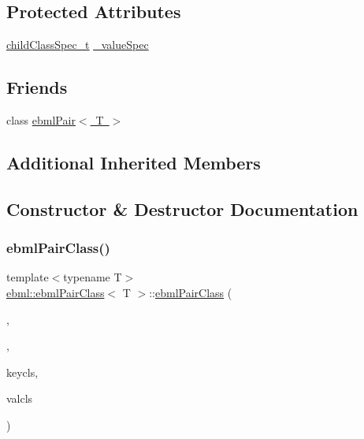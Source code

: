 \subsection*{Protected Attributes}
\begin{DoxyCompactItemize}
\item 
\mbox{\hyperlink{classebml_1_1childClassSpec__t}{child\+Class\+Spec\+\_\+t}} \mbox{\hyperlink{classebml_1_1ebmlPairClass_ad560a3a9e6b47eb8e51e707de59df919}{\+\_\+value\+Spec}}
\end{DoxyCompactItemize}
\subsection*{Friends}
\begin{DoxyCompactItemize}
\item 
class \mbox{\hyperlink{classebml_1_1ebmlPairClass_ad1db4b5395f31070d1be2d251ee85e02}{ebml\+Pair$<$ T $>$}}
\end{DoxyCompactItemize}
\subsection*{Additional Inherited Members}


\subsection{Constructor \& Destructor Documentation}
\mbox{\label{classebml_1_1ebmlPairClass_aeb7ee60aa846a317cecc39c5c79aeb2e}} 
\subsubsection{\texorpdfstring{ebml\+Pair\+Class()}{ebmlPairClass()}\hspace{0.1cm}{\footnotesize\ttfamily [1/4]}}
{\footnotesize\ttfamily template$<$typename T$>$ \\
\mbox{\hyperlink{classebml_1_1ebmlPairClass}{ebml\+::ebml\+Pair\+Class}}$<$ T $>$\+::\mbox{\hyperlink{classebml_1_1ebmlPairClass}{ebml\+Pair\+Class}} (\begin{DoxyParamCaption}\item[{const char $\ast$}]{,  }\item[{const std\+::wstring \&}]{,  }\item[{const \mbox{\hyperlink{classebml_1_1ebmlElementClass}{ebml\+Element\+Class}} $\ast$}]{keycls,  }\item[{const \mbox{\hyperlink{classebml_1_1ebmlElementClass}{ebml\+Element\+Class}} $\ast$}]{valcls }\end{DoxyParamCaption})}

